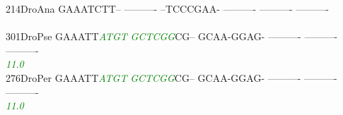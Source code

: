 \documentclass[11pt,twoside,reqno,a4paper]{article}
\begin{document}
{214\hspace*{1\charwidth}DroAna	GAAATCTT--	----------	--TCCCGAA-	----------	----------	----------	\\
\hspace*{4\charwidth}\hspace*{7\charwidth}\hspace*{1\charwidth}\hspace*{1\charwidth}\hspace*{1\charwidth}\hspace*{1\charwidth}\hspace*{1\charwidth}\hspace*{1\charwidth}\\
301\hspace*{1\charwidth}DroPse	GAAATT\textit{\textcolor{green}{A}}\textit{\textcolor{green}{T}}\textit{\textcolor{green}{G}}\textit{\textcolor{green}{T}}	\textit{\textcolor{green}{G}}\textit{\textcolor{green}{C}}\textit{\textcolor{green}{T}}\textit{\textcolor{green}{C}}\textit{\textcolor{green}{G}}\textit{\textcolor{green}{G}}CG--	GCAA-GGAG-	----------	----------	----------	\\
\hspace*{4\charwidth}\hspace*{7\charwidth}\hspace*{6\charwidth}\textit{\textcolor{green}{11.0}}\hspace*{1\charwidth}\hspace*{1\charwidth}\hspace*{1\charwidth}\hspace*{1\charwidth}\hspace*{1\charwidth}\hspace*{1\charwidth}\\
276\hspace*{1\charwidth}DroPer	GAAATT\textit{\textcolor{green}{A}}\textit{\textcolor{green}{T}}\textit{\textcolor{green}{G}}\textit{\textcolor{green}{T}}	\textit{\textcolor{green}{G}}\textit{\textcolor{green}{C}}\textit{\textcolor{green}{T}}\textit{\textcolor{green}{C}}\textit{\textcolor{green}{G}}\textit{\textcolor{green}{G}}CG--	GCAA-GGAG-	----------	----------	----------	\\
\hspace*{4\charwidth}\hspace*{7\charwidth}\hspace*{6\charwidth}\textit{\textcolor{green}{11.0}}\hspace*{1\charwidth}\hspace*{1\charwidth}\hspace*{1\charwidth}\hspace*{1\charwidth}\hspace*{1\charwidth}\hspace*{1\charwidth}\\
}
\end{document}
